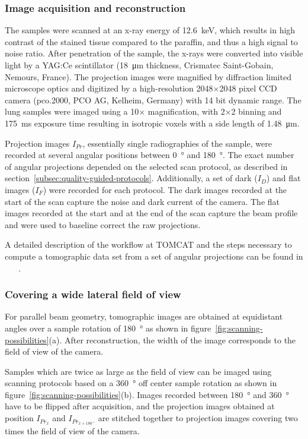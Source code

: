 \subsubsection{Image acquisition and reconstruction}
\label{seq:Image Acquisition}
The samples were scanned at an x-ray energy of \SI{12.6}{\kilo\electronvolt}, which results in high contrast of the stained tissue compared to the paraffin, and thus a high signal to noise ratio. After penetration of the sample, the x-rays were converted into visible light by a YAG:Ce scintillator (\SI{18}{\micro\meter} thickness, Crismatec Saint-Gobain, Nemours, France). The projection images were magnified by diffraction limited microscope optics and digitized by a high-resolution 2048$\times$2048 pixel CCD camera (pco.2000, PCO AG, Kelheim, Germany) with 14 bit dynamic range. The lung samples were imaged using a 10$\times$ magnification, with 2$\times$2 binning and \SI{175}{\milli\second} exposure time resulting in isotropic voxels with a side length of \SI{1.48}{\micro\meter}.

Projection images $I_{Pr}$, essentially single radiographies of the sample, were recorded at several angular positions between \SI{0}{\degree} and \SI{180}{\degree}. The exact number of angular projections depended on the selected scan protocol, as described in section~\ref{subsec:quality-guided-protocols}. Additionally, a set of dark ($I_{D}$) and flat images ($I_{F}$) were recorded for each protocol. The dark images recorded at the start of the scan capture the noise and dark current of the camera. The flat images recorded at the start and at the end of the scan capture the beam profile and were used to baseline correct the raw projections.

A detailed description of the workflow at TOMCAT and the steps necessary to compute a tomographic data set from a set of angular projections can be found in%
\ifhtml
	~\citet{Hintermueller2009}
\else
	~
\fi%
.

\subsubsection{Covering a wide lateral field of view}
For parallel beam geometry, tomographic images are obtained at equidistant angles over a sample rotation of \SI{180}{\degree} as shown in figure~\ref{fig:scanning-possibilities}(a). After reconstruction, the width of the image corresponds to the field of view of the camera.

Samples which are twice as large as the field of view can be imaged using scanning protocols based on a \SI{360}{\degree} off center sample rotation as shown in figure~\ref{fig:scanning-possibilities}(b). Images recorded between \SI{180}{\degree} and \SI{360}{\degree} have to be flipped after acquisition, and the projection images obtained at position $I_{Pr_{x}}$ and $I_{Pr_{x+\SI{180}{\degree}}}$ are stitched together to projection images covering two times the field of view of the camera.

